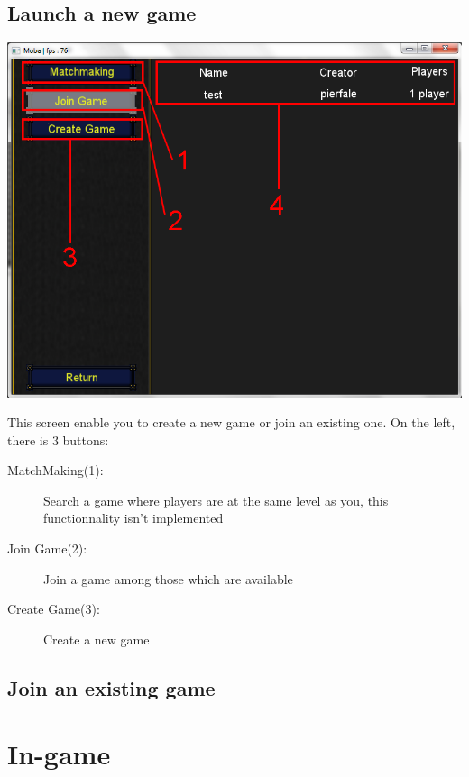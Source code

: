 \documentclass{scrreprt}
\begin{document}
		  \section{Launch a new game}
		  \begin{center}
		  \includegraphics[scale=0.4]{launch_screen.png}
		  \end{center}
		  This screen enable you to create a new game or join an existing one. On the left, there is 3 buttons:
		  \begin{description}
		  \item[MatchMaking(1):]{Search a game where players are at the same level as you, this functionnality isn't implemented}
		  \item[Join Game(2):]{Join a game among those which are available}
		  \item[Create Game(3):]{Create a new game}
		  \end{description}
		  \section{Join an existing game}
		  \chapter{In-game}
\end{document}
